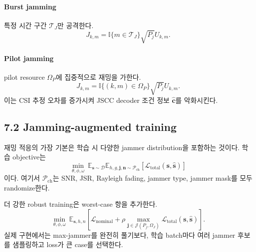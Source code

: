 \documentclass[11pt,a4paper]{article}
\begin{document}
\paragraph{Burst jamming}
특정 시간 구간 $\mathcal{T}_J$만 공격한다.
\begin{equation}
    J_{k,m}=\mathbb{I}\{m\in\mathcal{T}_J\}\sqrt{P_j}U_{k,m}.
\end{equation}

\paragraph{Pilot jamming}
pilot resource $\Omega_P$에 집중적으로 재밍을 가한다.
\begin{equation}
    J_{k,m}=\mathbb{I}\{(k,m)\in\Omega_P\}\sqrt{P_j}U_{k,m}.
\end{equation}
이는 CSI 추정 오차를 증가시켜 JSCC decoder 조건 정보 $\hat{\bm{c}}$를 악화시킨다.

\subsection{7.2 Jamming-augmented training}
재밍 적응의 가장 기본은 학습 시 다양한 jammer distribution을 포함하는 것이다. 학습 objective는
\begin{equation}
    \min_{\theta,\phi,\omega}\ \mathbb{E}_{\bm{s}\sim\mathcal{D}}\mathbb{E}_{h,g,\bm{j},\bm{n}\sim\mathcal{P}_{\mathrm{ch}}}
    \left[\mathcal{L}_{\mathrm{total}}(\bm{s},\hat{\bm{s}})\right]
\end{equation}
이다. 여기서 $\mathcal{P}_{\mathrm{ch}}$는 SNR, JSR, Rayleigh fading, jammer type, jammer mask를 모두 randomize한다.

더 강한 robust training은 worst-case 항을 추가한다.
\begin{equation}
    \min_{\theta,\phi,\omega}\ \mathbb{E}_{\bm{s},h,n}\left[
    \mathcal{L}_{\mathrm{nominal}}
    +\rho\max_{\bm{j}\in\mathcal{J}(P_j,\Omega_J)}
    \mathcal{L}_{\mathrm{total}}(\bm{s},\hat{\bm{s}})
    \right].
\end{equation}
실제 구현에서는 max-jammer를 완전히 풀기보다, 학습 batch마다 여러 jammer 후보를 샘플링하고 loss가 큰 case를 선택한다.
\end{document}
